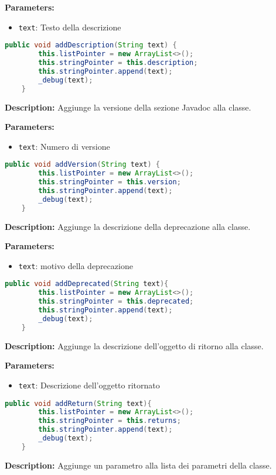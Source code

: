 \textbf{Parameters:}
\begin{itemize}
  \item\texttt{text}: Testo della descrizione
\end{itemize}

\begin{lstlisting}[language=Java]
    public void addDescription(String text) {
        this.listPointer = new ArrayList<>();
        this.stringPointer = this.description;
        this.stringPointer.append(text);
        _debug(text);
    }
\end{lstlisting}
\vspace{0.5cm}
\textbf{Description:}  Aggiunge la versione della sezione Javadoc alla classe. 

\textbf{Parameters:}
\begin{itemize}
  \item\texttt{text}: Numero di versione
\end{itemize}

\begin{lstlisting}[language=Java]
    public void addVersion(String text) {
        this.listPointer = new ArrayList<>();
        this.stringPointer = this.version;
        this.stringPointer.append(text);
        _debug(text);
    }
\end{lstlisting}
\vspace{0.5cm}
\textbf{Description:}  Aggiunge la descrizione della deprecazione alla classe. 

\textbf{Parameters:}
\begin{itemize}
  \item\texttt{text}: motivo della deprecazione
\end{itemize}

\begin{lstlisting}[language=Java]
    public void addDeprecated(String text){
        this.listPointer = new ArrayList<>();
        this.stringPointer = this.deprecated;
        this.stringPointer.append(text);
        _debug(text);
    }
\end{lstlisting}
\vspace{0.5cm}
\textbf{Description:}  Aggiunge la descrizione dell'oggetto di ritorno alla classe. 

\textbf{Parameters:}
\begin{itemize}
  \item\texttt{text}: Descrizione dell'oggetto ritornato
\end{itemize}

\begin{lstlisting}[language=Java]
    public void addReturn(String text){
        this.listPointer = new ArrayList<>();
        this.stringPointer = this.returns;
        this.stringPointer.append(text);
        _debug(text);
    }
\end{lstlisting}
\vspace{0.5cm}
\textbf{Description:}  Aggiunge un parametro alla lista dei parametri della classe. 

